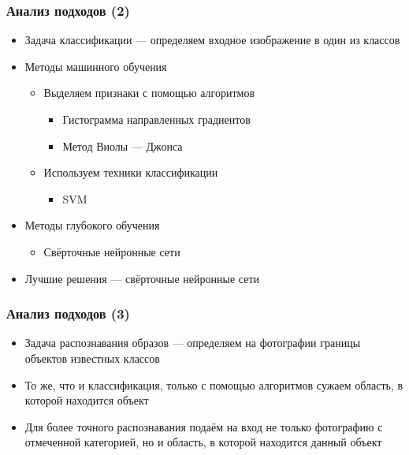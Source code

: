 \documentclass[xetex,mathserif,serif]{beamer}
\begin{document}
	
	\begin{frame}
		\frametitle{Анализ подходов (2)}
		
        \begin{itemize}
            \item Задача классификации — определяем входное изображение в один из классов
            \item Методы машинного обучения
                \begin{itemize}
                    \item Выделяем признаки с помощью алгоритмов
                        \begin{itemize}
                            \item Гистограмма направленных градиентов
                            \item Метод Виолы — Джонса
                        \end{itemize}
                    \item Используем техники классификации
                        \begin{itemize}
                            \item SVM
                        \end{itemize}
                \end{itemize} 
            \item Методы глубокого обучения
                \begin{itemize}
                    \item Свёрточные нейронные сети
                \end{itemize}
            \item Лучшие решения — свёрточные нейронные сети
        \end{itemize} 
        
	\end{frame}		


	\begin{frame}
		\frametitle{Анализ подходов (3)}
		
        \begin{itemize}
            \item Задача распознавания образов — определяем на фотографии границы объектов известных классов
            \item То же, что и классификация, только с помощью алгоритмов сужаем область, в которой находится объект
            \item Для более точного распознавания подаём на вход не только фотографию с отмеченной категорией, но и область, в которой находится данный объект
        \end{itemize} 
        
	\end{frame}	
	
\end{document}
